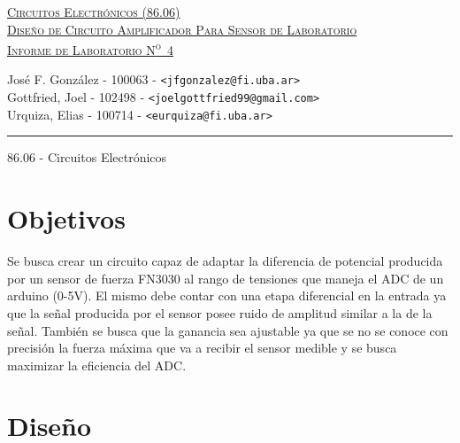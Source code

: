 \documentclass[a4paper, 10pt, spanish]{article}
\begin{document}
\begin{titlepage}
\vfill

\begin{center} %
\Large{\underline{\textsc{Circuitos Electrónicos (86.06)}}}\\ \vspace{0.5cm}
\Large{\underline{\textsc{Diseño de Circuito Amplificador Para Sensor de Laboratorio}}}\\ \vspace{0.5cm}
\Large{\underline{\textsc{Informe de Laboratorio N\textsuperscript{o}~4}}}
\end{center}

\vfill

\begin{center}
\large{José F. González - 100063 - \footnotesize{\verb!<jfgonzalez@fi.uba.ar>!}}\\ \vspace{0.25cm}
\large{Gottfried, Joel - 102498 - \footnotesize{\verb!<joelgottfried99@gmail.com>!}}\\\vspace{0.25cm}
\large{Urquiza, Elias - 100714 - \footnotesize{\verb!<eurquiza@fi.uba.ar>!}}\\
\end{center}

\vfill

\hrule
\vspace{0.2cm}

\noindent\small{86.06 - Circuitos Electrónicos \hfill }

\end{titlepage}

%
%
\tableofcontents
\newpage


\section{Objetivos}
    Se busca crear un circuito capaz de adaptar la diferencia de potencial producida por un sensor de fuerza FN3030 al rango de tensiones que maneja el ADC de un arduino (0-5V). El mismo debe contar con una etapa diferencial en la entrada ya que la señal producida por el sensor posee ruido de amplitud similar a la de la señal.
    También se busca que la ganancia sea ajustable ya que se no se conoce con precisión la fuerza máxima que va a recibir el sensor medible y se busca maximizar la eficiencia del ADC.

\section{Diseño}
\end{document}
